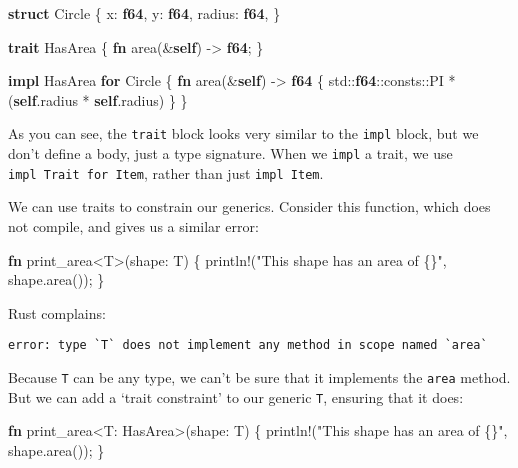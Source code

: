 \documentclass[a4paper,]{book}
\newenvironment{Shaded}{\begin{snugshade}}{\end{snugshade}}
\newcommand{\KeywordTok}[1]{\textcolor[rgb]{0.13,0.29,0.53}{\textbf{{#1}}}}
\newcommand{\StringTok}[1]{\textcolor[rgb]{0.31,0.60,0.02}{{#1}}}
\newcommand{\OtherTok}[1]{\textcolor[rgb]{0.56,0.35,0.01}{{#1}}}
\newcommand{\NormalTok}[1]{{#1}}
\begin{document}
\begin{Shaded}
\begin{Highlighting}[]
\KeywordTok{struct} \NormalTok{Circle \{}
    \NormalTok{x: }\KeywordTok{f64}\NormalTok{,}
    \NormalTok{y: }\KeywordTok{f64}\NormalTok{,}
    \NormalTok{radius: }\KeywordTok{f64}\NormalTok{,}
\NormalTok{\}}

\KeywordTok{trait} \NormalTok{HasArea \{}
    \KeywordTok{fn} \NormalTok{area(&}\KeywordTok{self}\NormalTok{) -> }\KeywordTok{f64}\NormalTok{;}
\NormalTok{\}}

\KeywordTok{impl} \NormalTok{HasArea }\KeywordTok{for} \NormalTok{Circle \{}
    \KeywordTok{fn} \NormalTok{area(&}\KeywordTok{self}\NormalTok{) -> }\KeywordTok{f64} \NormalTok{\{}
        \NormalTok{std::}\KeywordTok{f64}\NormalTok{::consts::PI * (}\KeywordTok{self}\NormalTok{.radius * }\KeywordTok{self}\NormalTok{.radius)}
    \NormalTok{\}}
\NormalTok{\}}
\end{Highlighting}
\end{Shaded}

As you can see, the \texttt{trait} block looks very similar to the
\texttt{impl} block, but we don't define a body, just a type signature.
When we \texttt{impl} a trait, we use \texttt{impl\ Trait\ for\ Item},
rather than just \texttt{impl\ Item}.

We can use traits to constrain our generics. Consider this function,
which does not compile, and gives us a similar error:

\begin{Shaded}
\begin{Highlighting}[]
\KeywordTok{fn} \NormalTok{print_area<T>(shape: T) \{}
    \OtherTok{println!}\NormalTok{(}\StringTok{"This shape has an area of \{\}"}\NormalTok{, shape.area());}
\NormalTok{\}}
\end{Highlighting}
\end{Shaded}

Rust complains:

\begin{verbatim}
error: type `T` does not implement any method in scope named `area`
\end{verbatim}

Because \texttt{T} can be any type, we can't be sure that it implements
the \texttt{area} method. But we can add a `trait constraint' to our
generic \texttt{T}, ensuring that it does:

\begin{Shaded}
\begin{Highlighting}[]
\KeywordTok{fn} \NormalTok{print_area<T: HasArea>(shape: T) \{}
    \OtherTok{println!}\NormalTok{(}\StringTok{"This shape has an area of \{\}"}\NormalTok{, shape.area());}
\NormalTok{\}}
\end{Highlighting}
\end{Shaded}
\end{document}
